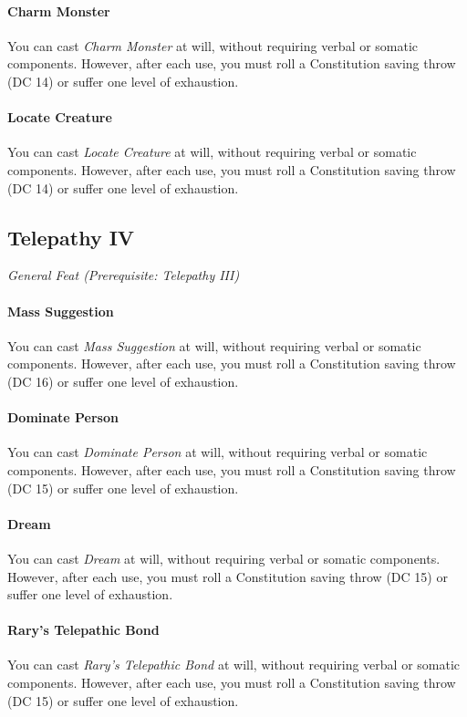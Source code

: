 \documentclass[twocolumn]{dndbook}
\begin{document}
\paragraph*{Charm Monster} You can cast \emph{Charm Monster} at will,
without requiring verbal or somatic components. However, after each use, you must roll a Constitution saving throw (DC 14) or suffer one level of exhaustion.
\paragraph*{Locate Creature} You can cast \emph{Locate Creature} at will,
without requiring verbal or somatic components. However, after each use, you must roll a Constitution saving throw (DC 14) or suffer one level of exhaustion.

\subsection{Telepathy IV}
{\emph{General Feat (Prerequisite: Telepathy III)}}\par
\paragraph*{Mass Suggestion} You can cast \emph{Mass Suggestion} at will,
without requiring verbal or somatic components. However, after each use, you must roll a Constitution saving throw (DC 16) or suffer one level of exhaustion.
\paragraph*{Dominate Person} You can cast \emph{Dominate Person} at will,
without requiring verbal or somatic components. However, after each use, you must roll a Constitution saving throw (DC 15) or suffer one level of exhaustion.
\paragraph*{Dream} You can cast \emph{Dream} at will,
without requiring verbal or somatic components. However, after each use, you must roll a Constitution saving throw (DC 15) or suffer one level of exhaustion.
\paragraph*{Rary's Telepathic Bond} You can cast \emph{Rary's Telepathic Bond} at will,
without requiring verbal or somatic components. However, after each use, you must roll a Constitution saving throw (DC 15) or suffer one level of exhaustion.
\end{document}
